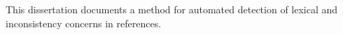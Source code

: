 This dissertation documents a method for automated detection of
lexical and inconsistency concerns in {\bibtex} references.
